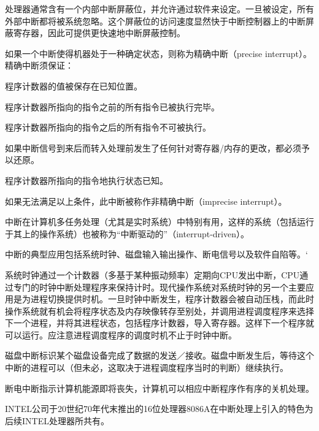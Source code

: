 处理器通常含有一个内部中断屏蔽位，并允许通过软件来设定。一旦被设定，所有外部中断都将被系统忽略。这个屏蔽位的访问速度显然快于中断控制器上的中断屏蔽寄存器，因此可提供更快速地中断屏蔽控制。

如果一个中断使得机器处于一种确定状态，则称为精确中断（precise interrupt）。精确中断须保证：

\begin{compactitem}
\item 程序计数器的值被保存在已知位置。
\item 程序计数器所指向的指令之前的所有指令已被执行完毕。
\item 程序计数器所指向的指令之后的所有指令不可被执行。

如果中断信号到来后而转入处理前发生了任何针对寄存器/内存的更改，都必须予以还原。
\item 程序计数器所指向的指令地执行状态已知。
\end{compactitem}


如果无法满足以上条件，此中断被称作非精确中断（imprecise interrupt）。

中断在计算机多任务处理（尤其是实时系统）中特别有用，这样的系统（包括运行于其上的操作系统）也被称为“中断驱动的”（interrupt-driven）。


中断的典型应用包括系统时钟、磁盘输入输出操作、断电信号以及软件自陷等。‘

\begin{compactitem}
\item 系统时钟通过一个计数器（多基于某种振动频率）定期向CPU发出中断，CPU通过专门的时钟中断处理程序来保持计时。现代操作系统对系统时钟的另一个主要应用是为进程切换提供时机。一旦时钟中断发生，程序计数器会被自动压栈，而此时操作系统就有机会将程序状态及内存映像转存至别处，并调用进程调度程序来选择下一个进程，并将其进程状态，包括程序计数器，导入寄存器。这样下一个程序就可以运行。应注意进程调度程序的调度时机不止于时钟中断。
\item 磁盘中断标识某个磁盘设备完成了数据的发送／接收。磁盘中断发生后，等待这个中断的进程可以（但未必，这取决于进程调度程序当时的判断）继续执行。
\item 断电中断指示计算机能源即将丧失，计算机可以相应中断程序作有序的关机处理。
\end{compactitem}

INTEL公司于20世纪70年代末推出的16位处理器8086A在中断处理上引入的特色为后续INTEL处理器所共有。

